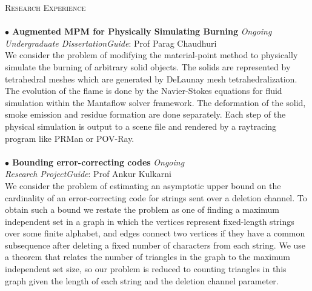 \documentclass[a4paper,9pt]{article}
\begin{document}
\textcolor{myrust}{\large{\textsc{Research Experience}}}\textcolor{mygray}{\sout{\hfill}}\\\\
\normalsize
\textbf{$\bullet$ Augmented MPM for Physically Simulating Burning} \hfill \textit{Ongoing}\\
\textcolor{mydarkgray}{\textit{Undergraduate Dissertation}}\hfill \textit{Guide}: \textcolor{mydarkgray}{Prof Parag Chaudhuri}\\
We consider the problem of modifying the material-point method to physically simulate the burning of arbitrary solid objects. The solids are represented by tetrahedral meshes which are generated by DeLaunay mesh tetrahedralization. The evolution of the flame is done by the Navier-Stokes equations for fluid simulation within the Mantaflow solver framework. The deformation of the solid, smoke emission and residue formation are done separately. Each step of the physical simulation is output to a scene file and rendered by a raytracing program like PRMan or POV-Ray.\\\\
\textbf{$\bullet$ Bounding error-correcting codes} \hfill \textit{Ongoing}\\
\textcolor{mydarkgray}{\textit{Research Project}}\hfill \textit{Guide}: \textcolor{mydarkgray}{Prof Ankur Kulkarni}\\
We consider the problem of estimating an asymptotic upper bound on the cardinality of an error-correcting code for strings sent over a deletion channel. To obtain such a bound we restate the problem as one of finding a maximum independent set in a graph in which the vertices represent fixed-length strings over some finite alphabet, and edges connect two vertices if they have a common subsequence after deleting a fixed number of characters from each string. We use a theorem that relates the number of triangles in the graph to the maximum independent set size, so our problem is reduced to counting triangles in this graph given the length of each string and the deletion channel parameter.\\
\end{document}
